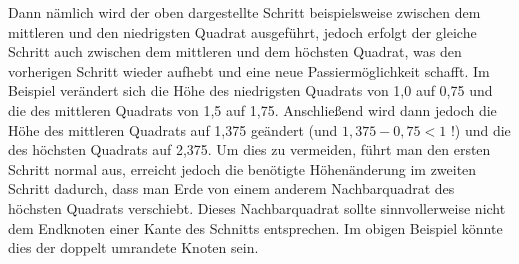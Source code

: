 \documentclass[a4paper, notitlepage, 12pt]{scrartcl}
\begin{document}
Dann nämlich wird der oben dargestellte Schritt beispielsweise zwischen dem mittleren und den niedrigsten Quadrat ausgeführt, jedoch erfolgt der gleiche Schritt auch zwischen dem mittleren und dem höchsten Quadrat, was den vorherigen Schritt wieder aufhebt und eine neue Passiermöglichkeit schafft. Im Beispiel verändert sich die Höhe des niedrigsten Quadrats von 1,0 auf 0,75 und die des mittleren Quadrats von 1,5 auf 1,75. Anschließend wird dann jedoch die Höhe des mittleren Quadrats auf 1,375 geändert (und $1,375 - 0,75 < 1$ !) und die des höchsten Quadrats auf 2,375. Um dies zu vermeiden, führt man den ersten Schritt normal aus, erreicht jedoch die benötigte Höhenänderung im zweiten Schritt dadurch, dass man Erde von einem anderem Nachbarquadrat des höchsten Quadrats verschiebt. Dieses Nachbarquadrat sollte sinnvollerweise nicht dem Endknoten einer Kante des Schnitts entsprechen. Im obigen Beispiel könnte dies der doppelt umrandete Knoten sein.
\end{document}
